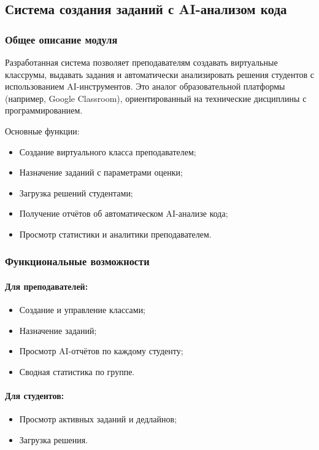 \subsection{Система создания заданий с AI-анализом кода}

\subsubsection{Общее описание модуля}
Разработанная система позволяет преподавателям создавать виртуальные классрумы, выдавать задания и автоматически анализировать решения студентов с использованием AI-инструментов. Это аналог образовательной платформы (например, Google Classroom), ориентированный на технические дисциплины с программированием.

Основные функции:
\begin{itemize}
  \item Создание виртуального класса преподавателем;
  \item Назначение заданий с параметрами оценки;
  \item Загрузка решений студентами;
  \item Получение отчётов об автоматическом AI-анализе кода;
  \item Просмотр статистики и аналитики преподавателем.
\end{itemize}

\subsubsection{Функциональные возможности}

\paragraph{Для преподавателей:}
\begin{itemize}
  \item Создание и управление классами;
  \item Назначение заданий;
  \item Просмотр AI-отчётов по каждому студенту;
  \item Сводная статистика по группе.
\end{itemize}

\paragraph{Для студентов:}
\begin{itemize}
  \item Просмотр активных заданий и дедлайнов;
  \item Загрузка решения.
\end{itemize}

